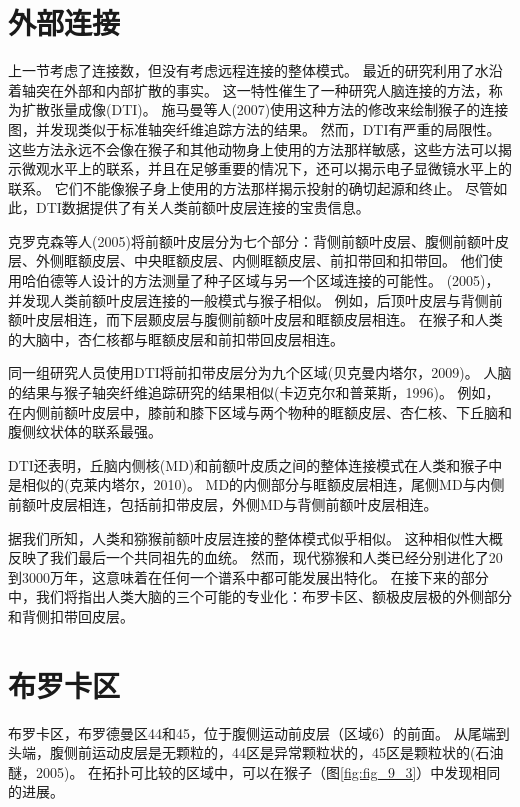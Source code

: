 \section{外部连接}

上一节考虑了连接数，但没有考虑远程连接的整体模式。
最近的研究利用了水沿着轴突在外部和内部扩散的事实。
这一特性催生了一种研究人脑连接的方法，称为扩散张量成像(DTI)。
施马曼等人(2007)使用这种方法的修改来绘制猴子的连接图，并发现类似于标准轴突纤维追踪方法的结果。
然而，DTI有严重的局限性。
这些方法永远不会像在猴子和其他动物身上使用的方法那样敏感，这些方法可以揭示微观水平上的联系，并且在足够重要的情况下，还可以揭示电子显微镜水平上的联系。
它们不能像猴子身上使用的方法那样揭示投射的确切起源和终止。
尽管如此，DTI数据提供了有关人类前额叶皮层连接的宝贵信息。
\par


克罗克森等人(2005)将前额叶皮层分为七个部分：背侧前额叶皮层、腹侧前额叶皮层、外侧眶额皮层、中央眶额皮层、内侧眶额皮层、前扣带回和扣带回。
他们使用哈伯德等人设计的方法测量了种子区域与另一个区域连接的可能性。
(2005)，并发现人类前额叶皮层连接的一般模式与猴子相似。
例如，后顶叶皮层与背侧前额叶皮层相连，而下层颞皮层与腹侧前额叶皮层和眶额皮层相连。
在猴子和人类的大脑中，杏仁核都与眶额皮层和前扣带回皮层相连。
\par


同一组研究人员使用DTI将前扣带皮层分为九个区域(贝克曼内塔尔，2009)。
人脑的结果与猴子轴突纤维追踪研究的结果相似(卡迈克尔和普莱斯，1996)。
例如，在内侧前额叶皮层中，膝前和膝下区域与两个物种的眶额皮层、杏仁核、下丘脑和腹侧纹状体的联系最强。
\par


DTI还表明，丘脑内侧核(MD)和前额叶皮质之间的整体连接模式在人类和猴子中是相似的(克莱内塔尔，2010)。
MD的内侧部分与眶额皮层相连，尾侧MD与内侧前额叶皮层相连，包括前扣带皮层，外侧MD与背侧前额叶皮层相连。
\par


据我们所知，人类和猕猴前额叶皮层连接的整体模式似乎相似。
这种相似性大概反映了我们最后一个共同祖先的血统。
然而，现代猕猴和人类已经分别进化了20到3000万年，这意味着在任何一个谱系中都可能发展出特化。
在接下来的部分中，我们将指出人类大脑的三个可能的专业化：布罗卡区、额极皮层极的外侧部分和背侧扣带回皮层。



\section{布罗卡区}

布罗卡区，布罗德曼区44和45，位于腹侧运动前皮层（区域6）的前面。
从尾端到头端，腹侧前运动皮层是无颗粒的，44区是异常颗粒状的，45区是颗粒状的(石油醚，2005)。
在拓扑可比较的区域中，可以在猴子（图\ref{fig:fig_9_3}）中发现相同的进展。
\par


